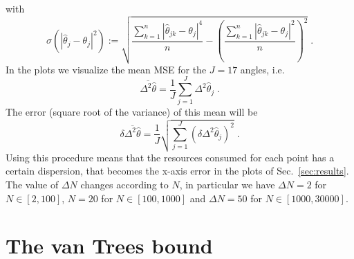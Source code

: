 \documentclass[aps, pra, 10pt, twocolumn, superscriptaddress,floatfix]{revtex4-1}
\begin{document}
%
with 
%
\begin{equation}
\sigma \left( | \hat{\theta}_j - \theta_j |^2 \right) := \sqrt{\frac{\sum \limits_{k=1}^{n} | \hat{\theta}_{jk} - \theta_j |^4}{n} - \left( \frac{\sum \limits_{k=1}^{n} | \hat{\theta}_{jk} - \theta_j |^2 }{n} \right)^2} \; .
\end{equation}
%
In the plots we visualize the mean MSE for the $J=17$ angles, i.e.
%
\begin{equation}
\overline{\Delta^2 \hat{\theta}} = \frac{1}{J} \sum \limits_{j=1}^{J} \Delta^2 \hat{\theta}_j \; .
\end{equation}
%
The error (square root of the variance) of this mean will be
%
\begin{equation}
	\delta \overline{\Delta^2 \hat{\theta}} = \frac{1}{J} \sqrt{ \sum \limits_{j=1}^{J} \left( \delta \Delta^2 \hat{\theta}_j \right)^2}\; .
\label{eq:errory}
\end{equation}
%
Using this procedure means that the resources consumed for each point has a certain dispersion, that becomes the x-axis error in the plots of Sec.~\ref{sec:results}. The value of $\Delta N$ changes according to $N$, in particular we have $\Delta N = 2$ for $N \in \left[2, 100 \right]$, $N = 20$ for $N \in \left[100, 1000 \right]$ and $\Delta N = 50$ for $N \in \left[1000, 30000 \right]$. 

\section{The van Trees bound}
%
\end{document}
